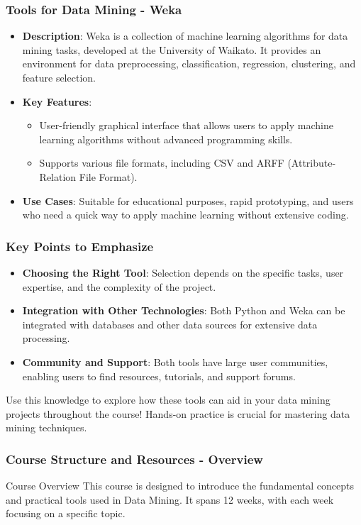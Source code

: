 \documentclass{beamer}
\begin{document}
\begin{frame}
    \frametitle{Tools for Data Mining - Weka}
    \begin{itemize}
        \item \textbf{Description}: Weka is a collection of machine learning algorithms for data mining tasks, developed at the University of Waikato. It provides an environment for data preprocessing, classification, regression, clustering, and feature selection.
        \item \textbf{Key Features}:
            \begin{itemize}
                \item User-friendly graphical interface that allows users to apply machine learning algorithms without advanced programming skills.
                \item Supports various file formats, including CSV and ARFF (Attribute-Relation File Format).
            \end{itemize}
        \item \textbf{Use Cases}: Suitable for educational purposes, rapid prototyping, and users who need a quick way to apply machine learning without extensive coding.
    \end{itemize}
\end{frame}

\begin{frame}
    \frametitle{Key Points to Emphasize}
    \begin{itemize}
        \item \textbf{Choosing the Right Tool}: Selection depends on the specific tasks, user expertise, and the complexity of the project.
        \item \textbf{Integration with Other Technologies}: Both Python and Weka can be integrated with databases and other data sources for extensive data processing.
        \item \textbf{Community and Support}: Both tools have large user communities, enabling users to find resources, tutorials, and support forums.
    \end{itemize}
    Use this knowledge to explore how these tools can aid in your data mining projects throughout the course! Hands-on practice is crucial for mastering data mining techniques.
\end{frame}

\begin{frame}[fragile]
    \frametitle{Course Structure and Resources - Overview}
    \begin{block}{Course Overview}
        This course is designed to introduce the fundamental concepts and practical tools used in Data Mining.
        It spans 12 weeks, with each week focusing on a specific topic.
    \end{block}
\end{frame}
\end{document}
